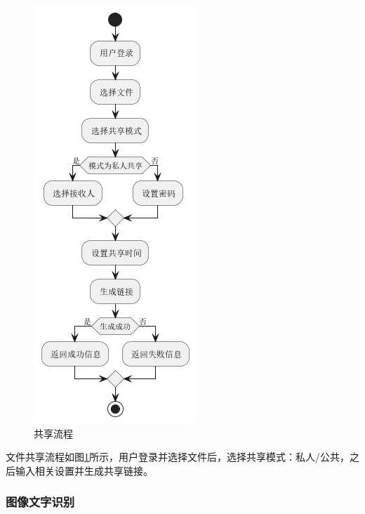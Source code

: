 \begin{figure}[H]
    \begin{center}
        \includegraphics[scale=0.7]{examples/共享流程图.png}
        \caption{共享流程}
        \label{fig:share}
    \end{center}
\end{figure}

文件共享流程如图\ref{fig:share}所示，用户登录并选择文件后，选择共享模式：私人/公共，之后输入相关设置并生成共享链接。

\subsubsection{图像文字识别}

